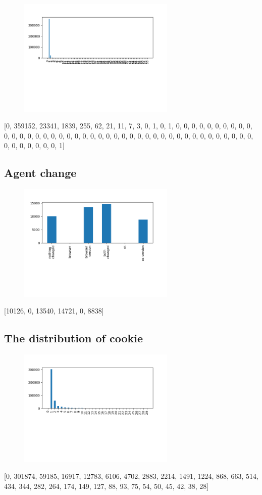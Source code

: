 \documentclass[10pt, conference, compsocconf]{IEEEtran}
\begin{document}
\begin{figure}[H]\centering\includegraphics[width=75mm,scale=0.5]{BasedonClientIDnumdevice}\end{figure}[0, 359152, 23341, 1839, 255, 62, 21, 11, 7, 3, 0, 1, 0, 1, 0, 0, 0, 0, 0, 0, 0, 0, 0, 0, 0, 0, 0, 0, 0, 0, 0, 0, 0, 0, 0, 0, 0, 0, 0, 0, 0, 0, 0, 0, 0, 0, 0, 0, 0, 0, 0, 0, 0, 0, 0, 0, 0, 0, 0, 0, 0, 0, 0, 1]\subsection{Agent change}
\begin{figure}[H]\centering\includegraphics[width=75mm,scale=0.5]{BasedonClientIDagentdis}\end{figure}[10126, 0, 13540, 14721, 0, 8838]\subsection{The distribution of cookie}
\begin{figure}[H]\centering\includegraphics[width=75mm,scale=0.5]{BasedonClientIDcookiedis}\end{figure}[0, 301874, 59185, 16917, 12783, 6106, 4702, 2883, 2214, 1491, 1224, 868, 663, 514, 434, 344, 282, 264, 174, 149, 127, 88, 93, 75, 54, 50, 45, 42, 38, 28]
\end{document}
